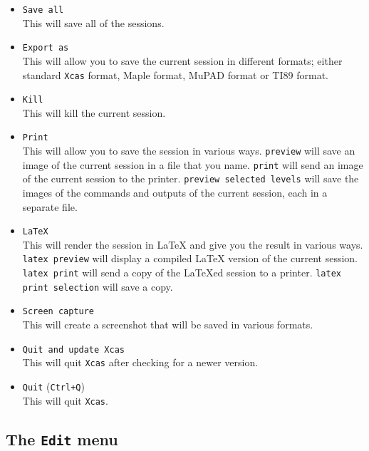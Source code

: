 \documentclass[a4paper,11pt]{book}
\begin{document}
\begin{itemize}
  \item
  \texttt{Save all}\\
  This will save all of the sessions.

  \item
  \texttt{Export as}\\
  This will allow you to save the current session in different
  formats; either standard \texttt{Xcas} format, Maple format, MuPAD
  format or TI89 format.

  \item
  \texttt{Kill}\\
  This will kill the current session.

  \item
  \texttt{Print}\\
  This will allow you to save the session in various ways.
  \texttt{preview} will save an image of the current session in a file
  that you name.  \texttt{print} will send an image of the current
  session to the printer.  \texttt{preview selected levels} will save the images of
  the commands and outputs of the current session, each in a separate
  file.

  \item
  \texttt{LaTeX}\\
  This will render the session in \LaTeX{} and give you the
  result in various ways.  \texttt{latex preview} will display a
  compiled \LaTeX{} version of the current session.  \texttt{latex
  print} will send a copy of the \LaTeX{}ed session to a printer.
  \texttt{latex print selection} will save a copy.

  \item  
  \texttt{Screen capture}\\
  This will create a screenshot that will be saved in various formats.
  
  \item \texttt{Quit and update Xcas}\\
  This will quit \texttt{Xcas} after checking for a newer version.
  
  \item \texttt{Quit} (\texttt{Ctrl+Q})\\
  This will quit \texttt{Xcas}.
\end{itemize}  

\subsection{The \texttt{Edit} menu}
\end{document}
